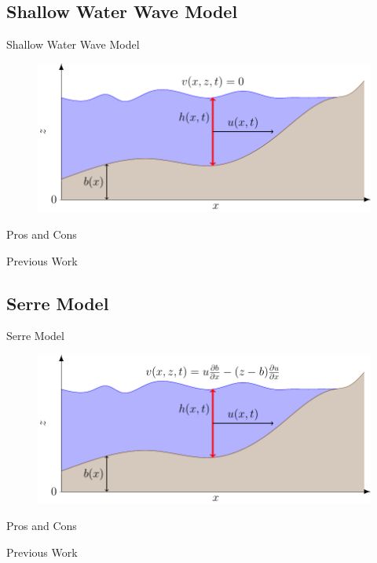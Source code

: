 \documentclass[pdf]{beamer}
\begin{document}
\subsection{Shallow Water Wave Model}
\begin{frame}{Shallow Water Wave Model}
	\begin{figure}
		\includegraphics[width=\textwidth]{./Pics/WaterModelDiagrams/SWWE.pdf}
	\end{figure}
\end{frame}
\begin{frame}{Pros and Cons}
\end{frame}
\begin{frame}{Previous Work}
\end{frame}


\subsection{Serre Model}

\begin{frame}{Serre Model}
	\begin{figure}
		\includegraphics[width=\textwidth]{./Pics/WaterModelDiagrams/Serre.pdf}
	\end{figure}
\end{frame}
\begin{frame}{Pros and Cons}
\end{frame}
\begin{frame}{Previous Work}
\end{frame}
\end{document}
